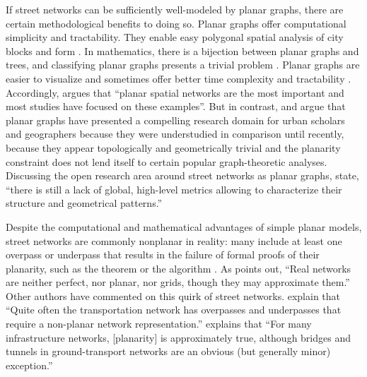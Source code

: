 \documentclass[Afour,sageh,times]{sagej}
\begin{document}
If street networks can be sufficiently well-modeled by planar graphs, there are certain methodological benefits to doing so. Planar graphs offer computational simplicity and tractability. They enable easy polygonal spatial analysis of city blocks and form \citep{fohl_non-planar_1996}. In mathematics, there is a bijection between planar graphs and trees, and classifying planar graphs presents a trivial problem \citep{louf_typology_2014}. Planar graphs are easier to visualize and sometimes offer better time complexity and tractability \citep{liebers_planarizing_2001}. Accordingly, \citet[p.~3]{barthelemy_spatial_2011} argues that \enquote{planar spatial networks are the most important and most studies have focused on these examples}. But in contrast, \citet{masucci_random_2009} and \citet{masucci_limited_2013} argue that planar graphs have presented a compelling research domain for urban scholars and geographers because they were understudied in comparison until recently, because they appear topologically and geometrically trivial and the planarity constraint does not lend itself to certain popular graph-theoretic analyses. Discussing the open research area around street networks as planar graphs, \citet[p.~1]{viana_simplicity_2013} state, \enquote{there is still a lack of global, high-level metrics allowing to characterize their structure and geometrical patterns.}

Despite the computational and mathematical advantages of simple planar models, street networks are commonly nonplanar in reality: many include at least one overpass or underpass that results in the failure of formal proofs of their planarity, such as the \citet{kuratowski_sur_1930} theorem or the \cite{hopcroft_efficient_1974} algorithm \citep[cf.][]{gastner_spatial_2006}. As \citet[p.~7]{levinson_network_2012} points out, \enquote{Real networks are neither perfect, nor planar, nor grids, though they may approximate them.} Other authors have commented on this quirk of street networks. \citet[p.~199]{jiang_object-oriented_2010} explain that \enquote{Quite often the transportation network has overpasses and underpasses that require a non-planar network representation.} \citet[p.~1258]{fischer_spatial_2014} explains that \enquote{For many infrastructure networks, {[planarity]} is approximately true, although bridges and tunnels in ground-transport networks are an obvious (but generally minor) exception.}
\end{document}
